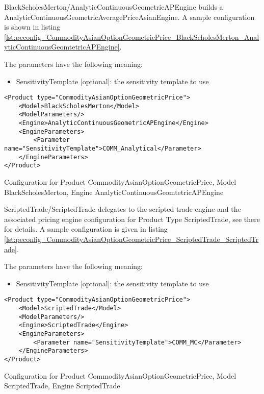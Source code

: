 BlackScholesMerton/AnalyticContinuousGeometricAPEngine builds a AnalyticContinuousGeometricAveragePriceAsianEngine. A sample
configuration is shown in listing
\ref{lst:peconfig_CommodityAsianOptionGeometricPrice_BlackScholesMerton_AnalyticContinuousGeomtetricAPEngine}.

The parameters have the following meaning:

\begin{itemize}
\item SensitivityTemplate [optional]: the sensitivity template to use 
\end{itemize}

\begin{longlisting}
\begin{verbatim}
<Product type="CommodityAsianOptionGeometricPrice">
    <Model>BlackScholesMerton</Model>
    <ModelParameters/>
    <Engine>AnalyticContinuousGeometricAPEngine</Engine>
    <EngineParameters>
        <Parameter name="SensitivityTemplate">COMM_Analytical</Parameter>
    </EngineParameters>
</Product>
\end{verbatim}
\caption{Configuration for Product CommodityAsianOptionGeometricPrice, Model BlackScholesMerton, Engine AnalyticContinuousGeomtetricAPEngine}
\label{lst:peconfig_CommodityAsianOptionGeometricPrice_BlackScholesMerton_AnalyticContinuousGeomtetricAPEngine}
\end{longlisting}

ScriptedTrade/ScriptedTrade delegates to the scripted trade engine and the associated pricing engine configuration for
Product Type ScriptedTrade, see there for details. A sample configuration is given in listing
\ref{lst:peconfig_CommodityAsianOptionGeometricPrice_ScriptedTrade_ScriptedTrade}.

The parameters have the following meaning:

\begin{itemize}
\item SensitivityTemplate [optional]: the sensitivity template to use 
\end{itemize}

\begin{longlisting}
\begin{verbatim}
<Product type="CommodityAsianOptionGeometricPrice">
    <Model>ScriptedTrade</Model>
    <ModelParameters/>
    <Engine>ScriptedTrade</Engine>
    <EngineParameters>
        <Parameter name="SensitivityTemplate">COMM_MC</Parameter>
    </EngineParameters>
</Product>
\end{verbatim}
\caption{Configuration for Product CommodityAsianOptionGeometricPrice, Model ScriptedTrade, Engine ScriptedTrade}
\label{lst:peconfig_CommodityAsianOptionGeometricPrice_ScriptedTrade_ScriptedTrade}
\end{longlisting}

